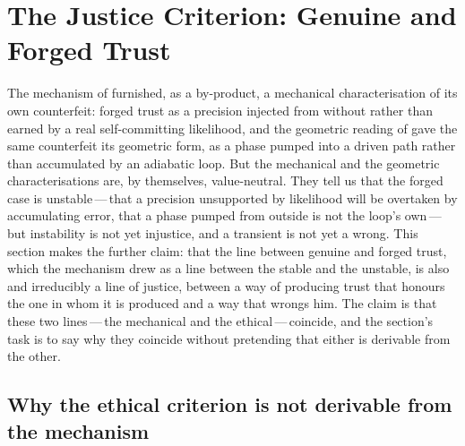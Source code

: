 \section{The Justice Criterion: Genuine and Forged Trust}
\label{p13:sec:justice}

\noindent
The mechanism of  furnished, as a by-product, a mechanical characterisation of its own counterfeit: forged trust as a precision injected from without rather than earned by a real self-committing likelihood, and the geometric reading of  gave the same counterfeit its geometric form, as a phase pumped into a driven path rather than accumulated by an adiabatic loop. But the mechanical and the geometric characterisations are, by themselves, value-neutral. They tell us that the forged case is unstable\,---\,that a precision unsupported by likelihood will be overtaken by accumulating error, that a phase pumped from outside is not the loop's own\,---\,but instability is not yet injustice, and a transient is not yet a wrong. This section makes the further claim: that the line between genuine and forged trust, which the mechanism drew as a line between the stable and the unstable, is also and irreducibly a line of justice, between a way of producing trust that honours the one in whom it is produced and a way that wrongs him. The claim is that these two lines\,---\,the mechanical and the ethical\,---\,coincide, and the section's task is to say why they coincide without pretending that either is derivable from the other.

\subsection{Why the ethical criterion is not derivable from the mechanism}
\label{p13:sub:just-notderivable}


